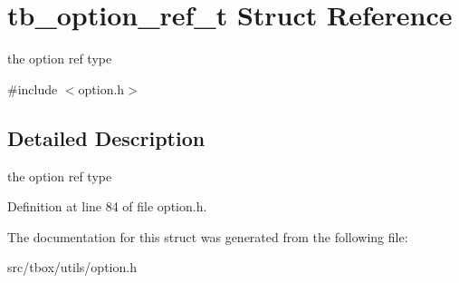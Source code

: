 \hypertarget{structtb__option__ref__t}{\section{tb\-\_\-option\-\_\-ref\-\_\-t Struct Reference}
\label{structtb__option__ref__t}
}


the option ref type  




{\ttfamily \#include $<$option.\-h$>$}



\subsection{Detailed Description}
the option ref type 

Definition at line 84 of file option.\-h.



The documentation for this struct was generated from the following file\-:\begin{DoxyCompactItemize}
\item 
src/tbox/utils/option.\-h\end{DoxyCompactItemize}
